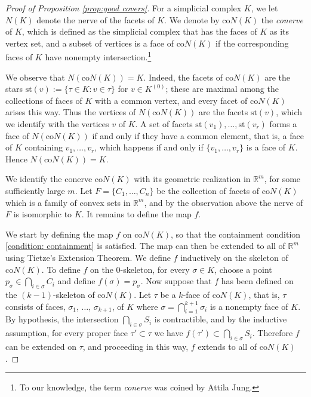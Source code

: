\documentclass[12pt,a4paper,oneside]{amsart}\sloppy
\theoremstyle{definition}
\newcommand{\co}{\text{co}N}
\newcommand{\cN}[1]{\text{co}N(#1)}
\newcommand{\faces}[2]{{#1}^{(#2)}}
\begin{document}
\begin{proof}[Proof of Proposition \ref{prop:good covers}]
For a simplicial complex $K$, we let $N(K)$ denote the nerve of the facets of $K$. We denote by $\cN{K}$ the \emph{conerve} of $K$, which is defined as the simplicial complex that has the faces of $K$ as its vertex set, and a subset of vertices is a face of $\cN{K}$ if the corresponding faces of $K$ have nonempty intersection.\footnote{To our knowledge, the term \emph{conerve} was coined by Attila Jung.}

We observe that $N(\cN{K})  = K$. Indeed, the facets of $\cN{K}$ are the stars $\mathrm{st}(v):=\{\tau\in K : v\in \tau\}$ for $v \in \faces{K}{0}$; these are maximal among the collections of faces of $K$ with a common vertex, and every facet of $\cN{K}$ arises this way. Thus the vertices of $N(\co(K))$ are the facets $\mathrm{st}(v)$, which we identify with the vertices $v$ of $K$. A set of facets $\mathrm{st}(v_1),\dots,\mathrm{st}(v_r)$ forms a face of $N(\co(K))$ if and only if they have a common element, that is, a face of $K$ containing $v_1,\dots,v_r$, which happens if and only if $\{v_1,\dots,v_r\}$ is a face of $K$. Hence $N(\co(K))=K$.

We identify the conerve $\cN{K}$ with its geometric realization in $\mathbb{R}^m$, for some sufficiently large $m$.  Let $F = \{C_1, \dots, C_n\}$ be the collection of facets of $\cN{K}$ which is a family of convex sets in $\mathbb{R}^m$, and by the observation above the nerve of $F$ is isomorphic to $K$. It remains to define the map $f$. 

We start by defining the map $f$ on $\cN{K}$, so that the containment condition \eqref{condition: containment} is satisfied. The map can then be extended to all of $\mathbb{R}^m$ using Tietze's Extension Theorem. We define $f$ inductively on the skeleton of $\cN{K}$. To define $f$ on the $0$-skeleton, for every $\sigma\in K$, choose a point $p_\sigma \in \bigcap_{i\in\sigma}C_i$ and define $f(\sigma) = p_\sigma$. Now suppose that $f$ has been defined on the $(k-1)$-skeleton of $\cN{K}$. Let $\tau$ be a $k$-face of $\cN{K}$, that is, $\tau$ consists of faces, $\sigma_1$, $\dots$, $\sigma_{k+1}$, of $K$ where $\sigma = \bigcap_{i=1}^{k+1} \sigma_i$ is a nonempty face of $K$. By hypothesis, the intersection $\bigcap_{i\in \sigma} S_i$ is contractible, and by the inductive assumption, for every proper face $\tau'\subset \tau$ we have $f(\tau') \subset \bigcap_{i\in \sigma} S_i$. Therefore $f$ can be extended on $\tau$, and proceeding in this way, $f$ extends to all of $\cN{K}$.


\end{proof}
\end{document}
